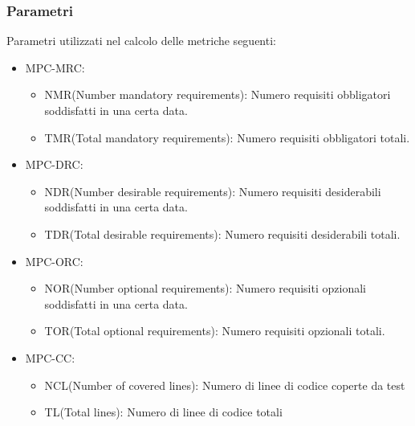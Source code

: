\subsubsection{Parametri}
Parametri utilizzati nel calcolo delle metriche seguenti:
\begin{itemize}

    \item MPC-MRC:
          \begin{itemize}
              \item NMR(Number mandatory requirements):  Numero requisiti obbligatori soddisfatti in una certa data.
              \item TMR(Total mandatory requirements):  Numero requisiti obbligatori totali.
          \end{itemize}
    \item MPC-DRC:
          \begin{itemize}
              \item NDR(Number desirable requirements): Numero requisiti desiderabili soddisfatti in una certa data.
              \item TDR(Total desirable requirements): Numero requisiti desiderabili totali.
          \end{itemize}
    \item MPC-ORC:
          \begin{itemize}
              \item NOR(Number optional requirements): Numero requisiti opzionali soddisfatti in una certa data.
              \item TOR(Total optional requirements): Numero requisiti opzionali totali.
          \end{itemize}

    \item MPC-CC:
          \begin{itemize}
              \item NCL(Number of covered lines): Numero di linee di codice coperte da test
              \item TL(Total lines): Numero di linee di codice totali
          \end{itemize}
\end{itemize}
